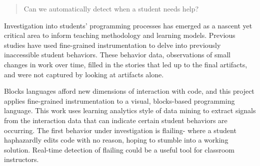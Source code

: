 % 
% 
%

\begin{quote}
Can we automatically detect when a student needs help?
\end{quote}
Investigation into students' programming processes has emerged as a nascent yet critical area to inform teaching methodology and learning models. Previous studies have used fine-grained instrumentation to delve into previously inaccessible student behaviors. These behavior data, observations of small changes in work over time, filled in the stories that led up to the final artifacts, and were not captured by looking at artifacts alone. 

Blocks languages afford new dimensions of interaction with code, and this project applies fine-grained instrumentation to a visual, blocks-based programming language. This work uses learning analytics style of data mining to extract signals from the interaction data that can indicate certain student behaviors are occurring. The first behavior under investigation is flailing- where a student haphazardly edits code with no reason, hoping to stumble into a working solution. Real-time detection of flailing could be a useful tool for classroom instructors.
